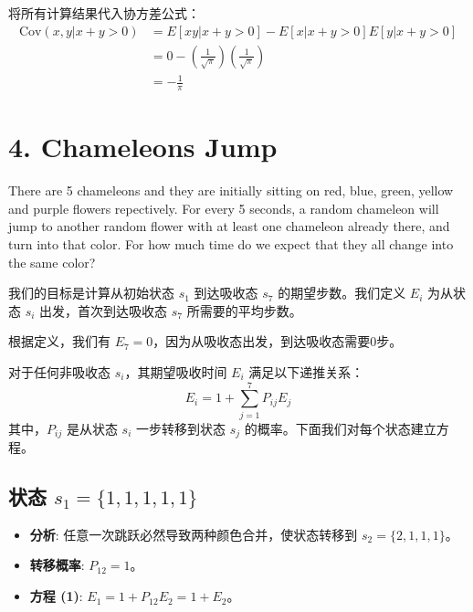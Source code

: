 \documentclass[UTF8]{ctexart}
\begin{document}
    将所有计算结果代入协方差公式：
    \begin{align*}
    \text{Cov}(x, y | x+y>0) &= E[xy | x+y>0] - E[x | x+y>0]E[y | x+y>0] \\
    &= 0 - \left(\frac{1}{\sqrt{\pi}}\right)\left(\frac{1}{\sqrt{\pi}}\right) \\
    &= - \frac{1}{\pi}
    \end{align*}


\section*{4. Chameleons Jump}

There are 5 chameleons and they are initially sitting on red, blue, green, yellow and purple flowers repectively. For every 5 seconds, a random chameleon will jump to another random flower with at least one chameleon already there, and turn into that color. For how much time do we expect that they all change into the same color?


我们的目标是计算从初始状态 $s_1$ 到达吸收态 $s_7$ 的期望步数。我们定义 $E_i$ 为从状态 $s_i$ 出发，首次到达吸收态 $s_7$ 所需要的平均步数。

根据定义，我们有 $E_7 = 0$，因为从吸收态出发，到达吸收态需要0步。

对于任何非吸收态 $s_i$，其期望吸收时间 $E_i$ 满足以下递推关系：
\[
E_i = 1 + \sum_{j=1}^{7} P_{ij} E_j
\]
其中，$P_{ij}$ 是从状态 $s_i$ 一步转移到状态 $s_j$ 的概率。下面我们对每个状态建立方程。

\subsection*{状态 $s_1 = \{1, 1, 1, 1, 1\}$}
\begin{itemize}
    \item \textbf{分析}: 任意一次跳跃必然导致两种颜色合并，使状态转移到 $s_2 = \{2, 1, 1, 1\}$。
    \item \textbf{转移概率}: $P_{12} = 1$。
    \item \textbf{方程 (1)}: $E_1 = 1 + P_{12}E_2 = 1 + E_2$。
\end{itemize}
\end{document}

